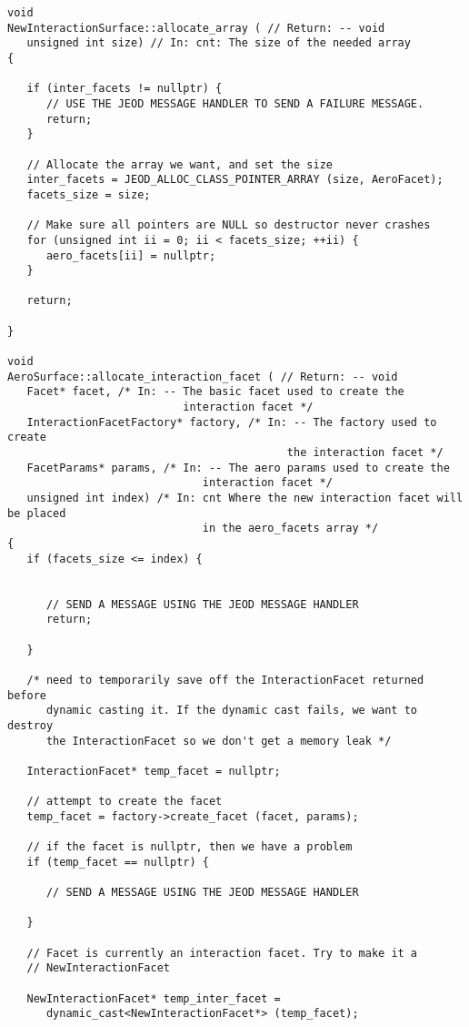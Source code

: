 \begin{verbatim}
void
NewInteractionSurface::allocate_array ( // Return: -- void
   unsigned int size) // In: cnt: The size of the needed array
{

   if (inter_facets != nullptr) {
      // USE THE JEOD MESSAGE HANDLER TO SEND A FAILURE MESSAGE.
      return;
   }

   // Allocate the array we want, and set the size
   inter_facets = JEOD_ALLOC_CLASS_POINTER_ARRAY (size, AeroFacet);
   facets_size = size;

   // Make sure all pointers are NULL so destructor never crashes
   for (unsigned int ii = 0; ii < facets_size; ++ii) {
      aero_facets[ii] = nullptr;
   }

   return;

}

void
AeroSurface::allocate_interaction_facet ( // Return: -- void
   Facet* facet, /* In: -- The basic facet used to create the
                           interaction facet */
   InteractionFacetFactory* factory, /* In: -- The factory used to create
                                           the interaction facet */
   FacetParams* params, /* In: -- The aero params used to create the
                              interaction facet */
   unsigned int index) /* In: cnt Where the new interaction facet will be placed
                              in the aero_facets array */
{
   if (facets_size <= index) {


      // SEND A MESSAGE USING THE JEOD MESSAGE HANDLER
      return;

   }

   /* need to temporarily save off the InteractionFacet returned before
      dynamic casting it. If the dynamic cast fails, we want to destroy
      the InteractionFacet so we don't get a memory leak */

   InteractionFacet* temp_facet = nullptr;

   // attempt to create the facet
   temp_facet = factory->create_facet (facet, params);

   // if the facet is nullptr, then we have a problem
   if (temp_facet == nullptr) {

      // SEND A MESSAGE USING THE JEOD MESSAGE HANDLER

   }

   // Facet is currently an interaction facet. Try to make it a
   // NewInteractionFacet

   NewInteractionFacet* temp_inter_facet =
      dynamic_cast<NewInteractionFacet*> (temp_facet);



\end{verbatim}
